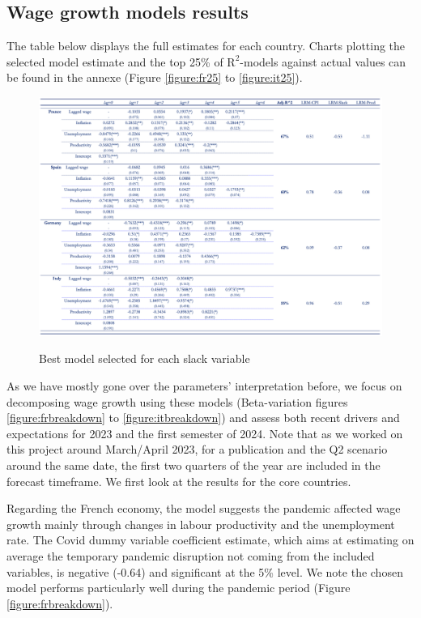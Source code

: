 \subsection{Wage growth models results}

\quad The table below displays the full estimates for each country. 
Charts plotting the selected model estimate and the top 25\% of $\textrm{R}^{2}$-models against actual values can be found in the annexe (Figure \ref{figure:fr25} to \ref{figure:it25}).

\begin{figure}[H]
    \centering
    \caption{Best model selected for each slack variable}
    \includegraphics[width=1\textwidth]{Core/2.Labour/img/labour_results.png}
    \label{figure:labour_results}
\end{figure}
\vspace{-1cm}
As we have mostly gone over the parameters’ interpretation before, we focus on decomposing wage growth using these models (Beta-variation figures \ref{figure:frbreakdown} to \ref{figure:itbreakdown}) and assess both recent drivers and expectations for 2023 and the first semester of 2024. 
Note that as we worked on this project around March/April 2023, for a publication and the Q2 scenario around the same date, the first two quarters of the year are included in the forecast timeframe. 
We first look at the results for the core countries.

Regarding the French economy, the model suggests the pandemic affected wage growth mainly through changes in labour productivity and the unemployment rate. 
The Covid dummy variable coefficient estimate, which aims at estimating on average the temporary pandemic disruption not coming from the included variables, is negative (-0.64) and significant at the 5\% level. 
We note the chosen model performs particularly well during the pandemic period (Figure \ref{figure:frbreakdown}).
\newpage 

